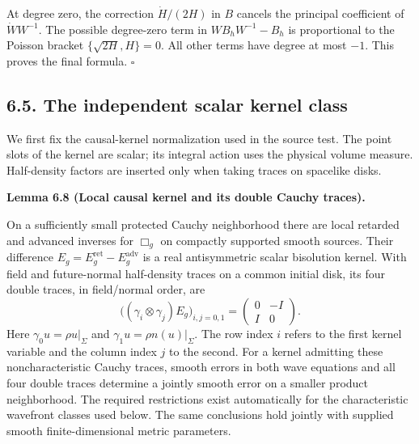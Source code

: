 \documentclass[
  english,
  11pt,
  reqno]{amsart}
\makeatletter
\newcommand{\pandocstatementheading}[1]{%
  \par\if@nobreak\else
    \addpenalty{\@beginparpenalty}%
    \addvspace{.5\baselineskip plus .2\baselineskip minus .2\baselineskip}%
  \fi
  {\normalfont\bfseries #1\par}%
  \nobreak\@afterindenttrue\@afterheading
}
\makeatother
\begin{document}
At degree zero, the correction \(\dot H/(2H)\) in \(B\) cancels the
principal coefficient of \(\dot W W^{-1}\). The possible degree-zero
term in \(WB_hW^{-1}-B_h\) is proportional to the Poisson bracket
\(\{\sqrt{2H},H\}=0\). All other terms have degree at most \(-1\). This
proves the final formula. \hfill\(\square\)

\subsection{6.5. The independent scalar kernel
class}\label{the-independent-scalar-kernel-class}\label{sec:online-wave-kernel-admission}

We first fix the causal-kernel normalization used in the source test.
The point slots of the kernel are scalar; its integral action uses the
physical volume measure. Half-density factors are inserted only when
taking traces on spacelike disks.

\pandocstatementheading{\leavevmode{}\label{lem:online-local-wave-green}Lemma 6.8 (Local causal kernel and its double Cauchy traces).}

On a sufficiently small protected Cauchy neighborhood there are local
retarded and advanced inverses for \(\Box_g\) on compactly supported
smooth sources. Their difference
\(E_g=E_g^{\mathrm{ret}}-E_g^{\mathrm{adv}}\) is a real antisymmetric
scalar bisolution kernel. With field and future-normal half-density
traces on a common initial disk, its four double traces, in field/normal
order, are%
 \[
\bigl((\gamma_i\otimes\gamma_j)E_g\bigr)_{i,j=0,1}
=\begin{pmatrix}0&-I\\ I&0\end{pmatrix}.
\] Here \(\gamma_0u=\rho u|_\Sigma\) and
\(\gamma_1u=\rho n(u)|_\Sigma\). The row index \(i\) refers to the first
kernel variable and the column index \(j\) to the second. For a kernel
admitting these noncharacteristic Cauchy traces, smooth errors in both
wave equations and all four double traces determine a jointly smooth
error on a smaller product neighborhood. The required restrictions exist
automatically for the characteristic wavefront classes used below. The
same conclusions hold jointly with supplied smooth finite-dimensional
metric parameters.
\end{document}
